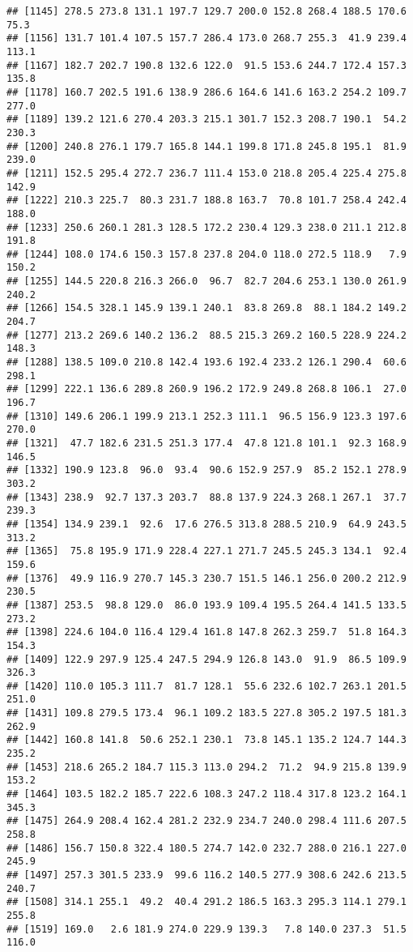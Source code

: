 \documentclass[]{article}
\begin{document}
\begin{verbatim}
## [1145] 278.5 273.8 131.1 197.7 129.7 200.0 152.8 268.4 188.5 170.6  75.3
## [1156] 131.7 101.4 107.5 157.7 286.4 173.0 268.7 255.3  41.9 239.4 113.1
## [1167] 182.7 202.7 190.8 132.6 122.0  91.5 153.6 244.7 172.4 157.3 135.8
## [1178] 160.7 202.5 191.6 138.9 286.6 164.6 141.6 163.2 254.2 109.7 277.0
## [1189] 139.2 121.6 270.4 203.3 215.1 301.7 152.3 208.7 190.1  54.2 230.3
## [1200] 240.8 276.1 179.7 165.8 144.1 199.8 171.8 245.8 195.1  81.9 239.0
## [1211] 152.5 295.4 272.7 236.7 111.4 153.0 218.8 205.4 225.4 275.8 142.9
## [1222] 210.3 225.7  80.3 231.7 188.8 163.7  70.8 101.7 258.4 242.4 188.0
## [1233] 250.6 260.1 281.3 128.5 172.2 230.4 129.3 238.0 211.1 212.8 191.8
## [1244] 108.0 174.6 150.3 157.8 237.8 204.0 118.0 272.5 118.9   7.9 150.2
## [1255] 144.5 220.8 216.3 266.0  96.7  82.7 204.6 253.1 130.0 261.9 240.2
## [1266] 154.5 328.1 145.9 139.1 240.1  83.8 269.8  88.1 184.2 149.2 204.7
## [1277] 213.2 269.6 140.2 136.2  88.5 215.3 269.2 160.5 228.9 224.2 148.3
## [1288] 138.5 109.0 210.8 142.4 193.6 192.4 233.2 126.1 290.4  60.6 298.1
## [1299] 222.1 136.6 289.8 260.9 196.2 172.9 249.8 268.8 106.1  27.0 196.7
## [1310] 149.6 206.1 199.9 213.1 252.3 111.1  96.5 156.9 123.3 197.6 270.0
## [1321]  47.7 182.6 231.5 251.3 177.4  47.8 121.8 101.1  92.3 168.9 146.5
## [1332] 190.9 123.8  96.0  93.4  90.6 152.9 257.9  85.2 152.1 278.9 303.2
## [1343] 238.9  92.7 137.3 203.7  88.8 137.9 224.3 268.1 267.1  37.7 239.3
## [1354] 134.9 239.1  92.6  17.6 276.5 313.8 288.5 210.9  64.9 243.5 313.2
## [1365]  75.8 195.9 171.9 228.4 227.1 271.7 245.5 245.3 134.1  92.4 159.6
## [1376]  49.9 116.9 270.7 145.3 230.7 151.5 146.1 256.0 200.2 212.9 230.5
## [1387] 253.5  98.8 129.0  86.0 193.9 109.4 195.5 264.4 141.5 133.5 273.2
## [1398] 224.6 104.0 116.4 129.4 161.8 147.8 262.3 259.7  51.8 164.3 154.3
## [1409] 122.9 297.9 125.4 247.5 294.9 126.8 143.0  91.9  86.5 109.9 326.3
## [1420] 110.0 105.3 111.7  81.7 128.1  55.6 232.6 102.7 263.1 201.5 251.0
## [1431] 109.8 279.5 173.4  96.1 109.2 183.5 227.8 305.2 197.5 181.3 262.9
## [1442] 160.8 141.8  50.6 252.1 230.1  73.8 145.1 135.2 124.7 144.3 235.2
## [1453] 218.6 265.2 184.7 115.3 113.0 294.2  71.2  94.9 215.8 139.9 153.2
## [1464] 103.5 182.2 185.7 222.6 108.3 247.2 118.4 317.8 123.2 164.1 345.3
## [1475] 264.9 208.4 162.4 281.2 232.9 234.7 240.0 298.4 111.6 207.5 258.8
## [1486] 156.7 150.8 322.4 180.5 274.7 142.0 232.7 288.0 216.1 227.0 245.9
## [1497] 257.3 301.5 233.9  99.6 116.2 140.5 277.9 308.6 242.6 213.5 240.7
## [1508] 314.1 255.1  49.2  40.4 291.2 186.5 163.3 295.3 114.1 279.1 255.8
## [1519] 169.0   2.6 181.9 274.0 229.9 139.3   7.8 140.0 237.3  51.5 116.0

\end{verbatim}
\end{document}
